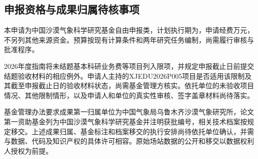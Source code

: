 \subsection{申报资格与成果归属待核事项}
本申请为中国沙漠气象科学研究基金自由申报类，计划执行期为，申请经费万元，不另列其他来源资金。预算按现有计算条件和两年研究任务编制，尚需履行审核与批准程序。

2026年度指南将未结题基本科研业务费等项目列入限项，并规定申报截止日前提交结题验收材料的相应例外。申请人主持的XJEDU2026P005项目是否适用该限制及其截至申报截止日的验收材料状态，尚需基金管理方核实。依托单位的未验收项目情况、其他限制情形，以及申请人和单位的真实性审核、签字盖章材料尚待落实。

基金管理办法要求成果第一归属单位为中国气象局乌鲁木齐沙漠气象研究所，论文第一资助基金列为中国沙漠气象科学研究基金并注明获批编号，相关技术档案按规定移交。上述成果归属、基金标注和档案移交的执行安排尚待依托单位确认，并需与数据、代码及知识产权的具体许可相容。原始场站数据的公开和移交以数据权利人授权为前提。
